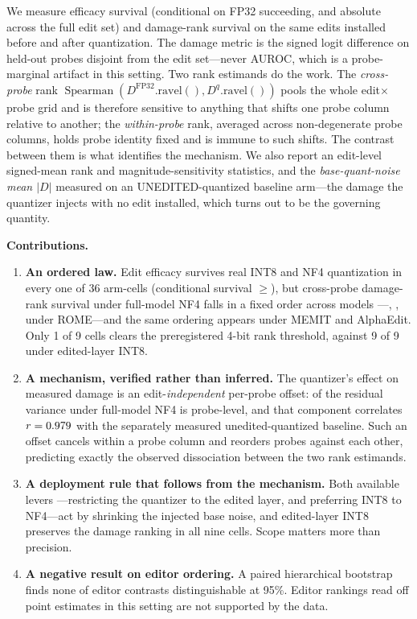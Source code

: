 \documentclass[preprint,12pt]{elsarticle}
\begin{document}
We measure efficacy survival (conditional on FP32 succeeding, and absolute across the
full edit set) and damage-rank survival on the same edits installed before and after
quantization. The damage metric is the signed logit difference on held-out probes
disjoint from the edit set---never AUROC, which is a probe-marginal artifact in this
setting. Two rank estimands do the work. The \emph{cross-probe} rank
$\operatorname{Spearman}(D^{\mathrm{FP32}}.\mathrm{ravel}(), D^{q}.\mathrm{ravel}())$
pools the whole edit${\times}$probe grid and is therefore sensitive to anything that
shifts one probe column relative to another; the \emph{within-probe} rank, averaged
across non-degenerate probe columns, holds probe identity fixed and is immune to such
shifts. The contrast between them is what identifies the mechanism. We also report an
edit-level signed-mean rank and magnitude-sensitivity statistics, and the
\emph{base-quant-noise mean $|D|$} measured on an UNEDITED-quantized baseline arm---the
damage the quantizer injects with no edit installed, which turns out to be the governing
quantity.

\textbf{Contributions.}
\begin{enumerate}
\item \textbf{An ordered law.} Edit efficacy survives real INT8 and NF4 quantization in
every one of 36 arm-cells (conditional survival $\geq$\pMinCondAll{}), but cross-probe
damage-rank survival under full-model NF4 falls in a fixed order across models
---\pFlatNfFMLOneRome{}, \pFlatNfFMLThreeRome{}, \pFlatNfFMQOneRome{} under ROME---and
the same ordering appears under MEMIT and AlphaEdit. Only 1 of 9 cells clears the
preregistered 4-bit rank threshold, against 9 of 9 under edited-layer INT8.
\item \textbf{A mechanism, verified rather than inferred.} The quantizer's effect on
measured damage is an edit-\emph{independent} per-probe offset:
\pAddShareNfFM{} of the residual variance under full-model NF4 is probe-level, and that
component correlates $r=0.979{}$ with the separately measured unedited-quantized
baseline. Such an offset cancels within a probe column and reorders probes against each
other, predicting exactly the observed dissociation between the two rank estimands.
\item \textbf{A deployment rule that follows from the mechanism.} Both available levers
---restricting the quantizer to the edited layer, and preferring INT8 to NF4---act by
shrinking the injected base noise, and edited-layer INT8 preserves the damage ranking in
all nine cells. Scope matters more than precision.
\item \textbf{A negative result on editor ordering.} A paired hierarchical bootstrap
finds none of \pBootNContrasts{} editor contrasts distinguishable at 95\%. Editor
rankings read off point estimates in this setting are not supported by the data.
\end{enumerate}
\end{document}
